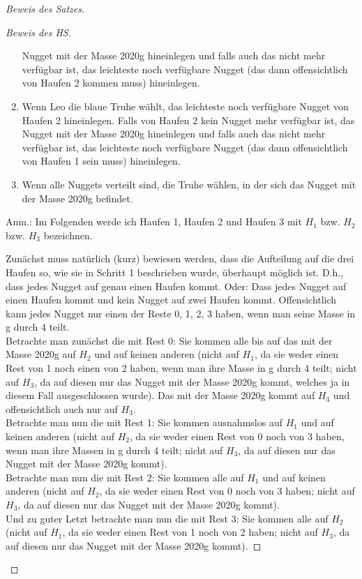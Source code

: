 \begin{proof}[Beweis des Satzes]
\begin{proof}[Beweis des HS]
\begin{enumerate}
            Nugget mit der Masse 2020g hineinlegen und falls auch das nicht mehr verfügbar ist, das leichteste noch 
            verfügbare Nugget (das dann offensichtlich von Haufen 2 kommen muss) hineinlegen.
            \item Wenn Leo die blaue Truhe wählt, das leichteste noch verfügbare Nugget von Haufen  2 hineinlegen. Falls 
            von Haufen 2 kein Nugget mehr verfügbar ist, das Nugget mit der Masse 2020g hineinlegen und falls auch das 
            nicht mehr verfügbar ist, das leichteste noch verfügbare Nugget (das dann offensichtlich von Haufen 1 
            sein muss) hineinlegen.
            \item Wenn alle Nuggets verteilt sind, die Truhe wählen, in der sich das Nugget mit der Masse 2020g 
            befindet.

        \end{enumerate}

        Anm.: Im Folgenden werde ich Haufen 1, Haufen 2 und Haufen 3 mit $H_1$ bzw. $H_2$ bzw. $H_3$ bezeichnen.

        Zunächst muss natürlich (kurz) bewiesen werden, dass die Aufteilung auf die drei Haufen so, wie sie in 
        Schritt 1 beschrieben wurde, überhaupt möglich ist. D.h., dass jedes Nugget auf genau einen Haufen kommt. 
        Oder: Dass jedes Nugget auf einen Haufen kommt und kein Nugget auf zwei Haufen kommt. Offensichtlich kann 
        jedes Nugget nur einen der Reste 0, 1, 2, 3 haben, wenn man seine Masse in g durch 4 teilt. \\
        Betrachte man zunächst die mit Rest 0: Sie kommen alle bis auf das mit der Masse 2020g auf $H_2$ und auf 
        keinen anderen (nicht auf $H_1$, da sie weder einen Rest von 1 noch einen von 2 haben, wenn man ihre 
        Masse in g durch 4 teilt; nicht auf $H_3$, da auf diesen nur das Nugget mit der Masse 2020g kommt, 
        welches ja in diesem Fall ausgeschlossen wurde). Das mit der Masse 2020g kommt auf $H_3$ und 
        offensichtlich auch nur auf $H_3$. \\
        Betrachte man nun die mit Rest 1: Sie kommen ausnahmslos auf $H_1$ und auf keinen anderen (nicht auf $H_2$, da sie 
        weder einen Rest von 0 noch von 3 haben, wenn man ihre Massen in g durch 4 teilt; nicht auf $H_3$, da auf 
        diesen nur das Nugget mit der Masse 2020g kommt). \\
        Betrachte man nun die mit Rest 2: Sie kommen alle auf $H_1$ und auf keinen anderen (nicht auf $H_2$, da sie weder 
        einen Rest von 0 noch von 3 haben; nicht auf $H_3$, da auf diesen nur das Nugget mit der Masse 2020g kommt). \\
        Und zu guter Letzt betrachte man nun die mit Rest 3: Sie kommen alle auf $H_2$ (nicht auf $H_1$, da sie weder 
        einen Rest von 1 noch von 2 haben; nicht auf $H_3$, da auf diesen nur das Nugget mit der Masse 2020g kommt).


\end{proof}
\end{proof}
